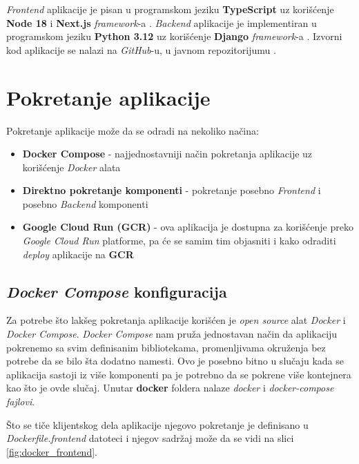 \documentclass[12pt,oneside]{memoir}
\begin{document}
\emph{Frontend} aplikacije je pisan u programskom jeziku \textbf{TypeScript} \cite{typescript} uz korišćenje \textbf{Node 18} \cite{node} i \textbf{Next.js} \emph{framework}-a \cite{next}.
\emph{Backend} aplikacije je implementiran u programskom jeziku \textbf{Python 3.12} \cite{python} uz korišćenje \textbf{Django} \emph{framework}-a \cite{django}. Izvorni kod aplikacije se nalazi na \emph{GitHub}-u, u javnom repozitorijumu \cite{github}.

\section{Pokretanje aplikacije}

Pokretanje aplikacije može da se odradi na nekoliko načina:
\begin{itemize}
    \item \textbf{Docker Compose} \cite{docker_compose} - najjednostavniji način pokretanja aplikacije uz korišćenje \emph{Docker} alata \cite{docker}
    \item \textbf{Direktno pokretanje komponenti} - pokretanje posebno \emph{Frontend} i posebno \emph{Backend} komponenti
    \item \textbf{Google Cloud Run (GCR)} \cite{gcr} - ova aplikacija je dostupna za korišćenje preko \emph{Google Cloud Run} platforme, pa će se samim tim objasniti i kako odraditi \emph{deploy} aplikacije na \textbf{GCR}
\end{itemize}

\subsection{\emph{Docker Compose} konfiguracija}
Za potrebe što lakšeg pokretanja aplikacije korišćen je \emph{open source} alat \emph{Docker} i \emph{Docker Compose}. \emph{Docker Compose} nam pruža jednostavan način da aplikaciju pokrenemo sa svim definisanim bibliotekama, promenljivama okruženja bez potrebe da se bilo šta dodatno namesti. Ovo je posebno bitno u slučaju kada se aplikacija sastoji iz više komponenti pa je potrebno da se pokrene više kontejnera kao što je ovde slučaj.
Unutar \textbf{docker} foldera nalaze \emph{docker} i \emph{docker-compose fajlovi}.

Što se tiče klijentskog dela aplikacije njegovo pokretanje je definisano u \emph{Dockerfile.frontend} datoteci i njegov sadržaj može da se vidi na slici \ref{fig:docker_frontend}.
\end{document}
